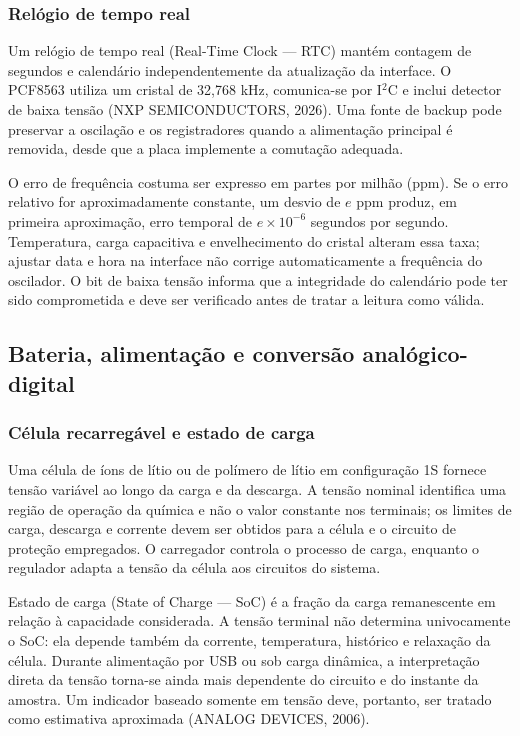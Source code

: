 \documentclass{article}
\begin{document}
\subsubsection{Rel\'ogio de tempo real}


Um rel\'ogio de tempo real (Real-Time Clock --- RTC) mant\'em contagem de segundos e calend\'ario independentemente da atualiza\c{c}\~ao da interface. O PCF8563 utiliza um cristal de 32,768 kHz, comunica-se por I$^2$C e inclui detector de baixa tens\~ao (NXP SEMICONDUCTORS, 2026). Uma fonte de backup pode preservar a oscila\c{c}\~ao e os registradores quando a alimenta\c{c}\~ao principal \'e removida, desde que a placa implemente a comuta\c{c}\~ao adequada.


O erro de frequ\^encia costuma ser expresso em partes por milh\~ao (ppm). Se o erro relativo for aproximadamente constante, um desvio de \(e\) ppm produz, em primeira aproxima\c{c}\~ao, erro temporal de \(e\times10^{-6}\) segundos por segundo. Temperatura, carga capacitiva e envelhecimento do cristal alteram essa taxa; ajustar data e hora na interface n\~ao corrige automaticamente a frequ\^encia do oscilador. O bit de baixa tens\~ao informa que a integridade do calend\'ario pode ter sido comprometida e deve ser verificado antes de tratar a leitura como v\'alida.


\subsection{Bateria, alimenta\c{c}\~ao e convers\~ao anal\'ogico-digital}


\subsubsection{C\'elula recarreg\'avel e estado de carga}


Uma c\'elula de \'ions de l\'itio ou de pol\'imero de l\'itio em configura\c{c}\~ao 1S fornece tens\~ao vari\'avel ao longo da carga e da descarga. A tens\~ao nominal identifica uma regi\~ao de opera\c{c}\~ao da qu\'imica e n\~ao o valor constante nos terminais; os limites de carga, descarga e corrente devem ser obtidos para a c\'elula e o circuito de prote\c{c}\~ao empregados. O carregador controla o processo de carga, enquanto o regulador adapta a tens\~ao da c\'elula aos circuitos do sistema.


Estado de carga (State of Charge --- SoC) \'e a fra\c{c}\~ao da carga remanescente em rela\c{c}\~ao \`a capacidade considerada. A tens\~ao terminal n\~ao determina univocamente o SoC: ela depende tamb\'em da corrente, temperatura, hist\'orico e relaxa\c{c}\~ao da c\'elula. Durante alimenta\c{c}\~ao por USB ou sob carga din\^amica, a interpreta\c{c}\~ao direta da tens\~ao torna-se ainda mais dependente do circuito e do instante da amostra. Um indicador baseado somente em tens\~ao deve, portanto, ser tratado como estimativa aproximada (ANALOG DEVICES, 2006).
\end{document}
